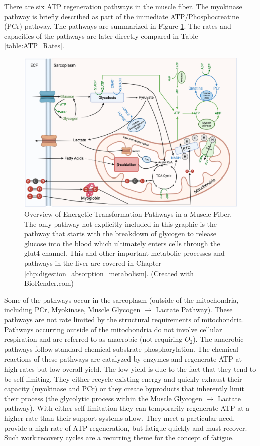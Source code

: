 There are six ATP regeneration pathways in the muscle fiber. The myokinase pathway is briefly described as part of the immediate ATP/Phosphocreatine (PCr) pathway. The pathways are summarized in Figure \ref{fig:Energetics_Overview}. The rates and capacities of the pathways are later directly compared in Table \ref{table:ATP_Rates}. 


\begin{figure}[!h]
    \centering
    \includegraphics[width=1\linewidth]{./figure/Energetics_Overview.png}
    \caption{Overview of Energetic Transformation Pathways in a Muscle Fiber. The only pathway not explicitly included in this graphic is the pathway that starts with the breakdown of glycogen to release glucose into the blood which ultimately enters cells through the glut4 channel. This and other important metabolic processes and pathways in the liver are covered in Chapter \ref{chp:digestion_absorption_metabolism}. (\footnotesize{Created with BioRender.com})}
    \label{fig:Energetics_Overview}
\end{figure}

Some of the pathways occur in the sarcoplasm (outside of the mitochondria, including PCr, Myokinase, Muscle Glycogen $\rightarrow$ Lactate Pathway). These pathways are not rate limited by the structural requirements of mitochondria.  Pathways occurring outside of the mitochondria do not involve cellular respiration and are referred to as anaerobic (not requiring $O_2$). The anaerobic pathways follow standard chemical substrate phosphorylation. The chemical reactions of these pathways are catalyzed by enzymes and regenerate ATP at high rates but low overall yield. The low yield is due to the fact that they tend to be self limiting. They either recycle existing energy and quickly exhaust their capacity (myokinase and PCr) or they create byproducts that inherently limit their process (the glycolytic process within the Muscle Glycogen $\rightarrow$ Lactate pathway). With either self limitation they can temporarily regenerate ATP at a higher rate than their support systems allow. They meet a particular need, provide a high rate of ATP regeneration, but fatigue quickly and must recover. Such work:recovery cycles are a recurring theme for the concept of fatigue.

